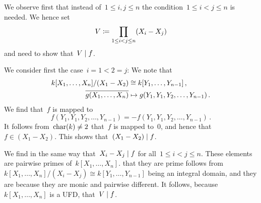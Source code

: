 \section{}

We observe first that instead of~$1 \leq i, j \leq n$ the condition~$1 \leq i < j \leq n$ is needed.
We hence set
\[
  V
  \coloneqq
  \prod_{1 \leq i < j \leq n} (X_i - X_j)
\]
and need to show that~$V \mid f$.

We consider first the case~$i = 1 < 2 = j$:
We note that
\begin{align*}
  k[X_1, \dotsc, X_n]/(X_1 - X_2)
  &\cong
  k[Y_1, \dotsc, Y_{n-1}] \,,
  \\
  \overline{ g(X_1, \dotsc, X_n) }
  &\mapsto
  g(Y_1, Y_1, Y_2, \dotsc, Y_{n-1}) \,.
\end{align*}
We find that~$f$ is mapped to
\[
  f(Y_1, Y_1, Y_2, \dotsc, Y_{n-1})
  =
  -f(Y_1, Y_1, Y_2, \dotsc, Y_{n-1})  \,.
\]
It follows from~$\operatorname{char}(k) \neq 2$ that~$f$ is mapped to~$0$, and hence that~$f \in (X_1 - X_2)$.
This shows that~$(X_1 - X_2) \mid f$.

We find in the same way that~$X_i - X_j \mid f$ for all~$1 \leq i < j \leq n$.
These elements are pairwise  primes of~$k[X_1, \dotsc, X_n]$.
that they are prime follows from~$k[X_1, \dotsc, X_n]/(X_i - X_j) \cong k[Y_1, \dotsc, Y_{n-1}]$ being an integral domain, and they are  because they are monic and pairwise different.
It follows, because~$k[X_1, \dotsc, X_n]$ is a UFD, that~$V \mid f$.


